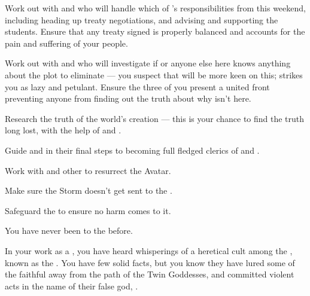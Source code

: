 \documentclass[char]{GL2020}
\begin{document}
\begin{itemz}
    \item Work out with \cJuniorStatesman{} and \cChupLeader{} who will handle which of \cHeadDiplomat{}’s responsibilities from this weekend, including heading up treaty negotiations, and advising and supporting the students. Ensure that any treaty signed is properly balanced and accounts for the pain and suffering of your people.
    \item Work out with \cJuniorStatesman{} and \cChupLeader{} who will investigate if \cDiplomat{} or anyone else here knows anything about the plot to eliminate \cHeadDiplomat{} — you suspect that \cJuniorStatesman{} will be more keen on this; \cChupLeader{} strikes you as lazy and petulant. Ensure the three of you present a united front preventing anyone from finding out the truth about why \cHeadDiplomat{} isn't here.
    \item Research the truth of the world’s creation — this is your chance to find the truth long lost, with the help of \cHeadScientist{} and \cScholarship{}.
    \item Guide \cInitiate{} and \cWarlordDaughter{} in their final steps to becoming full fledged clerics of \cEbb{} and \cFlow{}.
    \item Work with \cFlowPriest{} and other \pShippies{} to resurrect the \cEbb{} Avatar.
    \item Make sure the Storm doesn't get sent to the \pShip{}.
    \item Safeguard the \iChalice{} to ensure no harm comes to it.
\end{itemz}

\begin{itemz}[Notes]
    \item You have never been to the \pSchool{} before.
    \item In your work as a \cEbbPriest{\cleric}, you have heard whisperings of a heretical cult among the \pShip{}, known as the \pGoaties{}. You have few solid facts, but you know they have lured some of the faithful away from the path of the Twin Goddesses, and committed violent acts in the name of their false god, \cGenesis{}.
\end{itemz}
\end{document}
